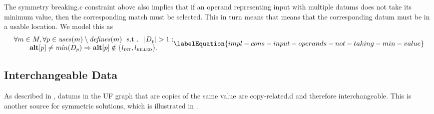 The \gls{symmetry breaking.c} \gls{constraint} above also implies that if an
\gls{operand} representing input with multiple \glspl{datum} does not take its
minimum value, then the corresponding \gls{match} must be selected.
%
This in turn means that means that the corresponding \gls{datum} must be in a
usable \gls{location}.
%
We model this as
%
\begin{equation}
  \begin{array}{@{}c@{}}
    \forall m \in \mMatchSet,
    \forall p \in \mUses(m) \setminus \mDefines(m)
    \text{ \st }
    \mCard{\mDataSet[p]} > 1 : \\
    \mVar{alt}[p] \neq \mMin(\mDataSet[p])
    \mImp
    \mVar{alt}[p] \notin \mSet{\mIntLocation, \mKilledLocation}.
  \end{array}
  \labelEquation{impl-cons-input-operands-not-taking-min-value}
\end{equation}


\subsection{Interchangeable Data}

As described in , \glspl{datum} in the \gls{UF
  graph} that are copies of the same value are \gls{copy-related.d} and
therefore interchangeable.
%
This is another source for symmetric \glspl{solution}, which is illustrated in
.

